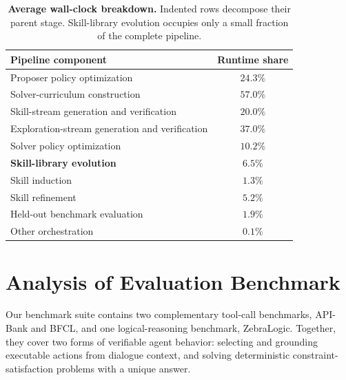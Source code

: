 \begin{table}[htbp]
    \centering
    \small
    \begin{tabular}{l c}
        \toprule
        \textbf{Pipeline component} & \textbf{Runtime share} \\
        \midrule
        Proposer policy optimization & $24.3\%$ \\
        Solver-curriculum construction & $57.0\%$ \\
        \quad Skill-stream generation and verification & $20.0\%$ \\
        \quad Exploration-stream generation and verification & $37.0\%$ \\
        Solver policy optimization & $10.2\%$ \\
        \textbf{Skill-library evolution} & \textbf{$6.5\%$} \\
        \quad Skill induction & $1.3\%$ \\
        \quad Skill refinement & $5.2\%$ \\
        Held-out benchmark evaluation & $1.9\%$ \\
        Other orchestration & $0.1\%$ \\
        \bottomrule
    \end{tabular}
    \caption{\textbf{Average wall-clock breakdown.} Indented rows decompose their parent stage. Skill-library evolution occupies only a small fraction of the complete pipeline.}
    \label{tab:computational_overhead}
\end{table}


\section{Analysis of Evaluation Benchmark}
\label{app:evaluation_benchmark}

Our benchmark suite contains two complementary tool-call benchmarks, API-Bank and BFCL, and one logical-reasoning benchmark, ZebraLogic.
Together, they cover two forms of verifiable agent behavior: selecting and grounding executable actions from dialogue context, and solving deterministic constraint-satisfaction problems with a unique answer.

